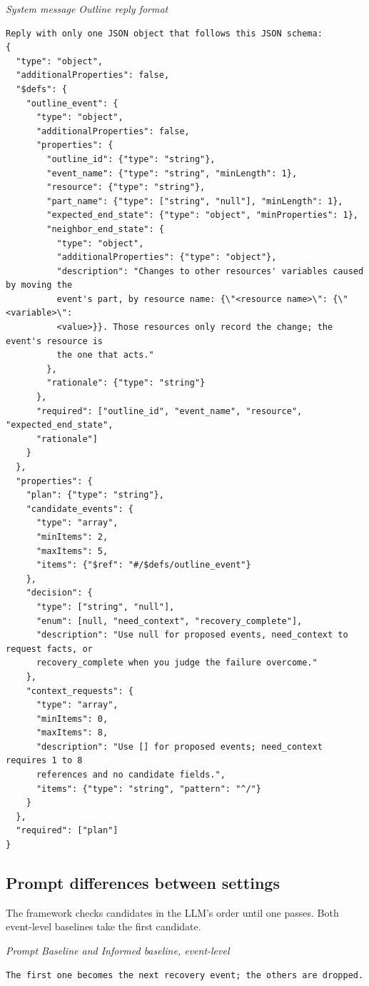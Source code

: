 \documentclass[preprint,12pt,authoryear]{elsarticle}
\newcommand{\recordlabel}[1]{\par\Needspace{4\baselineskip}\smallskip
  {\small\itshape #1\par}\nopagebreak}
\begin{document}
\recordlabel{System message \enspace Outline reply format}
\begin{lstlisting}[style=recorded]
Reply with only one JSON object that follows this JSON schema:
{
  "type": "object",
  "additionalProperties": false,
  "$defs": {
    "outline_event": {
      "type": "object",
      "additionalProperties": false,
      "properties": {
        "outline_id": {"type": "string"},
        "event_name": {"type": "string", "minLength": 1},
        "resource": {"type": "string"},
        "part_name": {"type": ["string", "null"], "minLength": 1},
        "expected_end_state": {"type": "object", "minProperties": 1},
        "neighbor_end_state": {
          "type": "object",
          "additionalProperties": {"type": "object"},
          "description": "Changes to other resources' variables caused by moving the
          event's part, by resource name: {\"<resource name>\": {\"<variable>\":
          <value>}}. Those resources only record the change; the event's resource is
          the one that acts."
        },
        "rationale": {"type": "string"}
      },
      "required": ["outline_id", "event_name", "resource", "expected_end_state",
      "rationale"]
    }
  },
  "properties": {
    "plan": {"type": "string"},
    "candidate_events": {
      "type": "array",
      "minItems": 2,
      "maxItems": 5,
      "items": {"$ref": "#/$defs/outline_event"}
    },
    "decision": {
      "type": ["string", "null"],
      "enum": [null, "need_context", "recovery_complete"],
      "description": "Use null for proposed events, need_context to request facts, or
      recovery_complete when you judge the failure overcome."
    },
    "context_requests": {
      "type": "array",
      "minItems": 0,
      "maxItems": 8,
      "description": "Use [] for proposed events; need_context requires 1 to 8
      references and no candidate fields.",
      "items": {"type": "string", "pattern": "^/"}
    }
  },
  "required": ["plan"]
}
\end{lstlisting}

\subsection{Prompt differences between settings}\label{sec:differences}

The framework checks candidates in the LLM's order until one passes. Both
event-level baselines take the first candidate.

\recordlabel{Prompt \enspace Baseline and Informed baseline, event-level}
\begin{lstlisting}
The first one becomes the next recovery event; the others are dropped.
\end{lstlisting}
\end{document}
